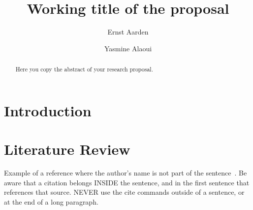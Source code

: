 \documentclass[english]{hogent-article}
\title{Working title of the proposal}
\author{Ernst Aarden}
\author{Yasmine Alaoui}
\begin{document}
\begin{abstract}
  Here you copy the abstract of your research proposal.
\end{abstract}

\tableofcontents

\bigskip






\section{Introduction}%
\label{sec:Introduction}


\lipsum[1-3]

\section{Literature Review}%
\label{sec:literature review}


Example of a reference where the author's name is not part of the sentence~\autocite{Moore2002}. Be aware that a citation belongs INSIDE the sentence, and in the first sentence that references that source. NEVER use the cite commands outside of a sentence, or at the end of a long paragraph.
\end{document}
